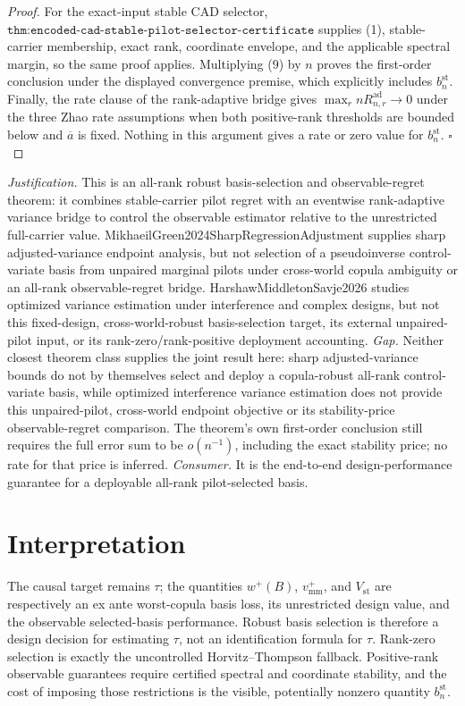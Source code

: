 \documentclass{article}
\begin{document}
\begin{proof}
For the exact-input stable CAD selector, \(\texttt{thm:encoded-cad-stable-pilot-selector-certificate}\) supplies (1), stable-carrier membership, exact rank, coordinate envelope, and the applicable spectral margin, so the same proof applies.  Multiplying (9) by \(n\) proves the first-order conclusion under the displayed convergence premise, which explicitly includes \(b_n^{\mathrm{st}}\).  Finally, the rate clause of the rank-adaptive bridge gives \(\max_r nR_{n,r}^{\mathrm{ad}}\to0\) under the three Zhao rate assumptions when both positive-rank thresholds are bounded below and \(\overline a\) is fixed.  Nothing in this argument gives a rate or zero value for \(b_n^{\mathrm{st}}\). \(\square\)
\end{proof}
\par\smallskip\noindent \textit{Justification.} This is an all-rank robust basis-selection and observable-regret theorem: it combines stable-carrier pilot regret with an eventwise rank-adaptive variance bridge to control the observable estimator relative to the unrestricted full-carrier value.  MikhaeilGreen2024SharpRegressionAdjustment supplies sharp adjusted-variance endpoint analysis, but not selection of a pseudoinverse control-variate basis from unpaired marginal pilots under cross-world copula ambiguity or an all-rank observable-regret bridge.  HarshawMiddletonSavje2026 studies optimized variance estimation under interference and complex designs, but not this fixed-design, cross-world-robust basis-selection target, its external unpaired-pilot input, or its rank-zero/rank-positive deployment accounting. \textit{Gap.} Neither closest theorem class supplies the joint result here: sharp adjusted-variance bounds do not by themselves select and deploy a copula-robust all-rank control-variate basis, while optimized interference variance estimation does not provide this unpaired-pilot, cross-world endpoint objective or its stability-price observable-regret comparison.  The theorem's own first-order conclusion still requires the full error sum to be \(o(n^{-1})\), including the exact stability price; no rate for that price is inferred. \textit{Consumer.} It is the end-to-end design-performance guarantee for a deployable all-rank pilot-selected basis.

\section{Interpretation}

The causal target remains \(\tau\); the quantities \(w^+(B)\), \(v_{\mathrm{mm}}^+\), and \(V_{\mathrm{st}}\) are respectively an ex ante worst-copula basis loss, its unrestricted design value, and the observable selected-basis performance.  Robust basis selection is therefore a design decision for estimating \(\tau\), not an identification formula for \(\tau\).  Rank-zero selection is exactly the uncontrolled Horvitz--Thompson fallback.  Positive-rank observable guarantees require certified spectral and coordinate stability, and the cost of imposing those restrictions is the visible, potentially nonzero quantity \(b_n^{\mathrm{st}}\).
\end{document}

